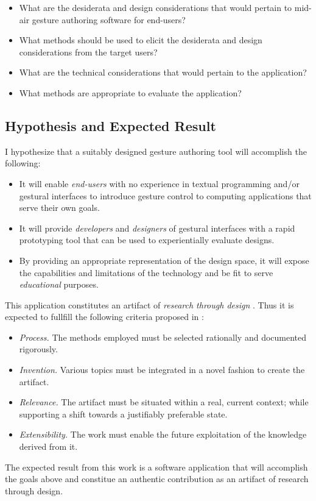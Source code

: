 \begin{itemize}
\item What are the desiderata and design considerations that would pertain to mid-air gesture authoring software for end-users?
\item What methods should be used to elicit the desiderata and design considerations from the target users?
\item What are the technical considerations that would pertain to the application?
\item What methods are appropriate to evaluate the application?
\end{itemize}

\subsection{Hypothesis and Expected Result} %

I hypothesize that a suitably designed gesture authoring tool will accomplish the following:

\begin{itemize}
\item It will enable \emph{end-users} with no experience in textual programming and/or gestural interfaces to introduce gesture control to computing applications that serve their own goals.
\item It will provide \emph{developers} and \emph{designers} of gestural interfaces with a rapid prototyping tool that can be used to experientially evaluate designs.
\item By providing an appropriate representation of the design space, it will expose the capabilities and limitations of the technology and be fit to serve \emph{educational} purposes.
\end{itemize}

This application constitutes an artifact of \emph{research through design} \parencite{Frayling:1993}. Thus it is expected to fullfill the following criteria proposed in \cite{Zimmerman:2007}:

\begin{itemize}
\item \emph{Process.} The methods employed must be selected rationally and documented rigorously.
\item \emph{Invention.} Various topics must be integrated in a novel fashion to create the artifact.
\item \emph{Relevance.} The artifact must be situated within a real, current context; while supporting a shift towards a justifiably preferable state.
\item \emph{Extensibility.} The work must enable the future exploitation of the knowledge derived from it.
\end{itemize}

The expected result from this work is a software application that will accomplish the goals above and constitue an authentic contribution as an artifact of research through design.
